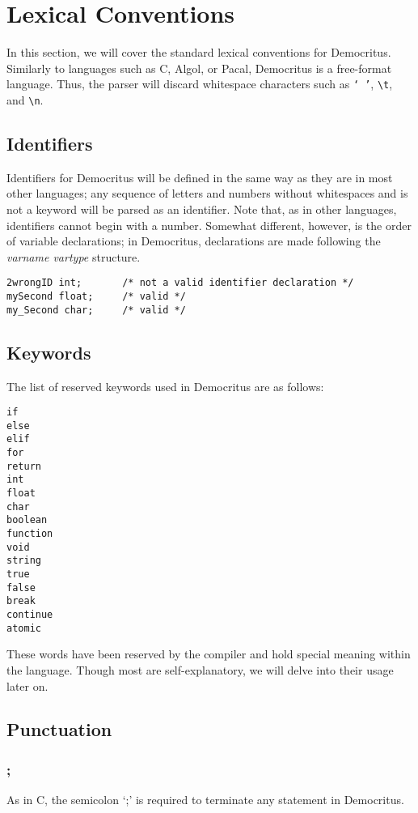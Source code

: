 \chapter{Lexical Conventions}
	In this section, we will cover the standard lexical conventions for Democritus. Similarly to languages such as C, Algol, or Pacal, Democritus is a free-format language. Thus, the parser will discard whitespace characters such as \texttt{` '}, \texttt{\textbackslash t}, and \texttt{\textbackslash n}.
	
	\section{Identifiers}
		Identifiers for Democritus will be defined in the same way as they are in most other languages; any sequence of letters and numbers without whitespaces and is not a keyword will be parsed as an identifier. Note that, as in other languages, identifiers cannot begin with a number. Somewhat different, however, is the order of variable declarations; in Democritus, declarations are made following the \textit{varname vartype} structure. 
		
	\begin{lstlisting}
2wrongID int;		/* not a valid identifier declaration */
mySecond float;		/* valid */
my_Second char;		/* valid */
	\end{lstlisting}
	
	\section{Keywords}
		The list of reserved keywords used in Democritus are as follows:
		\begin{lstlisting}[language={}]
if
else
elif
for
return
int
float
char
boolean
function
void
string
true
false
break
continue
atomic
		\end{lstlisting}
		\noindent These words have been reserved by the compiler and hold special meaning within the language. Though most are self-explanatory, we will delve into their usage later on. 
		
	\section{Punctuation}
		\subsection{;}
			As in C, the semicolon `;' is required to terminate any statement in Democritus. 
